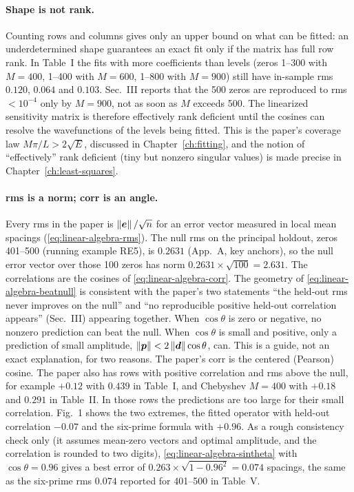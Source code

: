 \paragraph{Shape is not rank.} Counting rows and columns gives only an upper bound on what can be fitted: an underdetermined shape guarantees an exact fit only if the matrix has full row rank. In Table~I the fits with more coefficients than levels (zeros 1--300 with $M=400$, 1--400 with $M=600$, 1--800 with $M=900$) still have in-sample rms $0.120$, $0.064$ and $0.103$. Sec.~III reports that the 500 zeros are reproduced to rms $<10^{-4}$ only by $M=900$, not as soon as $M$ exceeds 500. The linearized sensitivity matrix is therefore effectively rank deficient until the cosines can resolve the wavefunctions of the levels being fitted. This is the paper's coverage law $M\pi/L>2\sqrt E$, discussed in Chapter~\ref{ch:fitting}, and the notion of ``effectively'' rank deficient (tiny but nonzero singular values) is made precise in Chapter~\ref{ch:least-squares}.

\paragraph{rms is a norm; corr is an angle.} Every rms in the paper is $\left\lVert \bm e\right\rVert/\sqrt n$ for an error vector measured in local mean spacings (\cref{eq:linear-algebra-rms}). The null rms on the principal holdout, zeros 401--500 (running example RE5), is $0.2631$ (App.~A, key anchors), so the null error vector over those 100 zeros has norm $0.2631\times\sqrt{100}=2.631$. The correlations are the cosines of \cref{eq:linear-algebra-corr}. The geometry of \cref{eq:linear-algebra-beatnull} is consistent with the paper's two statements ``the held-out rms never improves on the null'' and ``no reproducible positive held-out correlation appears'' (Sec.~III) appearing together. When $\cos\theta$ is zero or negative, no nonzero prediction can beat the null. When $\cos\theta$ is small and positive, only a prediction of small amplitude, $\left\lVert \bm p\right\rVert<2\left\lVert \bm d\right\rVert\cos\theta$, can. This is a guide, not an exact explanation, for two reasons. The paper's corr is the centered (Pearson) cosine. The paper also has rows with positive correlation and rms above the null, for example $+0.12$ with $0.439$ in Table~I, and Chebyshev $M=400$ with $+0.18$ and $0.291$ in Table~II. In those rows the predictions are too large for their small correlation. Fig.~1 shows the two extremes, the fitted operator with held-out correlation $-0.07$ and the six-prime formula with $+0.96$. As a rough consistency check only (it assumes mean-zero vectors and optimal amplitude, and the correlation is rounded to two digits), \cref{eq:linear-algebra-sintheta} with $\cos\theta=0.96$ gives a best error of $0.263\times\sqrt{1-0.96^2}=0.074$ spacings, the same as the six-prime rms $0.074$ reported for 401--500 in Table~V.

